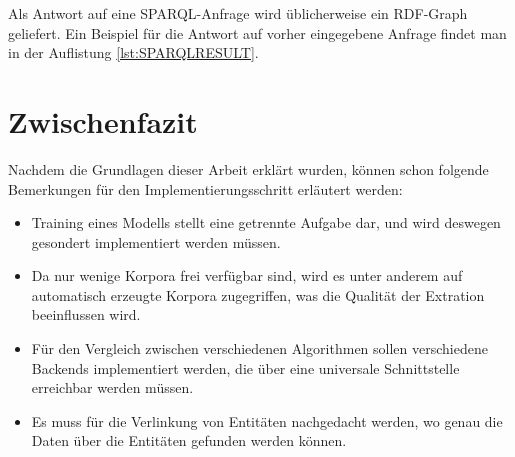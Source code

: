 Als Antwort auf eine SPARQL-Anfrage wird üblicherweise ein RDF-Graph geliefert. Ein Beispiel für die Antwort auf vorher eingegebene Anfrage findet man in der Auflistung \ref{lst:SPARQLRESULT}.

\lstset{language=XML}


\section{Zwischenfazit}
Nachdem die Grundlagen dieser Arbeit erklärt wurden, können schon folgende Bemerkungen für den Implementierungsschritt erläutert werden:
\begin{itemize}
\item Training eines Modells stellt eine getrennte Aufgabe dar, und wird deswegen gesondert implementiert werden müssen.
\item Da nur wenige Korpora frei verfügbar sind, wird es unter anderem auf automatisch erzeugte Korpora zugegriffen, was die Qualität der Extration beeinflussen wird.
\item Für den Vergleich zwischen verschiedenen Algorithmen sollen verschiedene Backends implementiert werden, die über eine universale Schnittstelle erreichbar werden müssen.
\item Es muss für die Verlinkung von Entitäten nachgedacht werden, wo genau die Daten über die Entitäten gefunden werden können.
\end{itemize}
